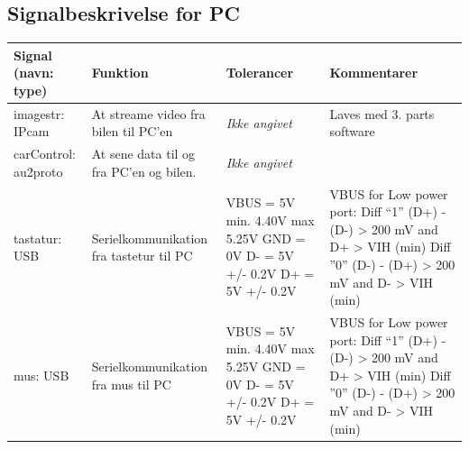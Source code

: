 \subsection{Signalbeskrivelse for PC}

\begin{table}[h]
	\centering
	\begin{tabularx}{\textwidth}{|l|Z|L{3.5cm}|Z|} \hline
	\textbf{Signal (navn: type)} & \textbf{Funktion} & \textbf{Tolerancer} & \textbf{Kommentarer} \\ \hline
imagestr: IPcam
	& At streame video fra bilen til PC'en 
	& \textit{Ikke angivet} 
 	& Laves med 3. parts software
	\\ \hline
	
carControl: au2proto
	& At sene data til og fra PC'en og bilen.
	& \textit{Ikke angivet} 
	& 
	\\ \hline
	
tastatur: USB
	& Serielkommunikation fra tastetur til PC 
	& VBUS = 5V min. 4.40V max 5.25V \newline
		GND = 0V \newline
		D- = 5V +/- 0.2V \newline
		D+ = 5V +/- 0.2V
	
	& VBUS for Low power port: \newline
		Diff  “1” \newline
		(D+) - (D-) > 200 mV \newline
		and D+ > VIH (min) \newline
		Diff ”0” \newline
		(D-) - (D+) > 200 mV \newline
		and D- > VIH (min)
	\\ \hline	
	
mus: USB
	& Serielkommunikation fra mus til PC 
	& VBUS = 5V min. 4.40V max 5.25V \newline
		GND = 0V \newline
		D- = 5V +/- 0.2V \newline
		D+ = 5V +/- 0.2V

	& VBUS for Low power port: \newline
		Diff  “1” \newline
		(D+) - (D-) > 200 mV \newline
		and D+ > VIH (min) \newline
		Diff ”0” \newline
		(D-) - (D+) > 200 mV \newline
		and D- > VIH (min)
\\ \hline
	

\end{tabularx}
\end{table}
